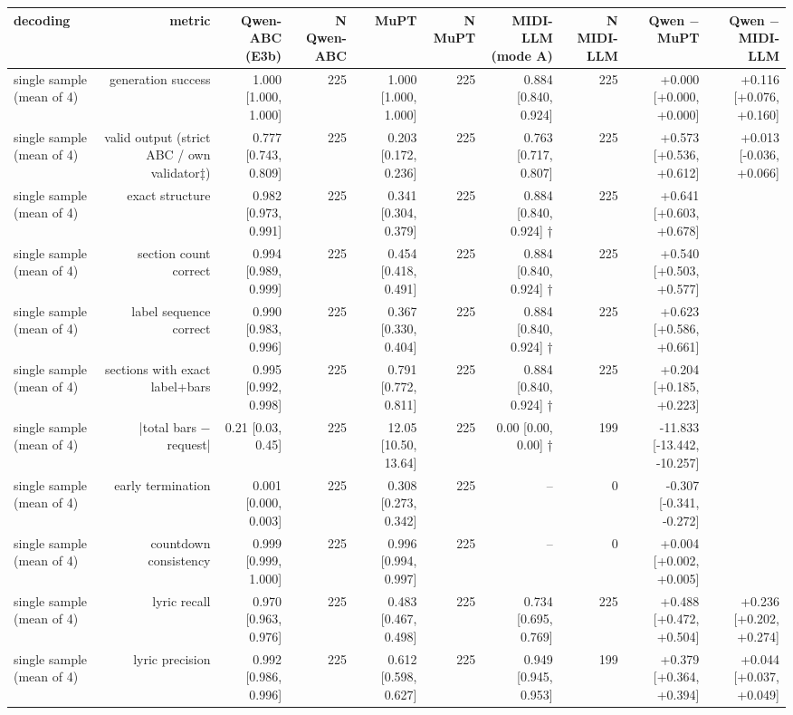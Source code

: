 \begin{table}[t]
\centering
\small
\begin{tabular}{lrrrrrrrrr}
\toprule
decoding & metric & Qwen-ABC (E3b) & N Qwen-ABC & MuPT & N MuPT & MIDI-LLM (mode A) & N MIDI-LLM & Qwen $-$ MuPT & Qwen $-$ MIDI-LLM \\
\midrule
single sample (mean of 4) & generation success & 1.000 [1.000, 1.000] & 225 & 1.000 [1.000, 1.000] & 225 & 0.884 [0.840, 0.924] & 225 & +0.000 [+0.000, +0.000] & +0.116 [+0.076, +0.160] \\
single sample (mean of 4) & valid output (strict ABC / own validator‡) & 0.777 [0.743, 0.809] & 225 & 0.203 [0.172, 0.236] & 225 & 0.763 [0.717, 0.807] & 225 & +0.573 [+0.536, +0.612] & +0.013 [-0.036, +0.066] \\
single sample (mean of 4) & exact structure & 0.982 [0.973, 0.991] & 225 & 0.341 [0.304, 0.379] & 225 & 0.884 [0.840, 0.924] † & 225 & +0.641 [+0.603, +0.678] &  \\
single sample (mean of 4) & section count correct & 0.994 [0.989, 0.999] & 225 & 0.454 [0.418, 0.491] & 225 & 0.884 [0.840, 0.924] † & 225 & +0.540 [+0.503, +0.577] &  \\
single sample (mean of 4) & label sequence correct & 0.990 [0.983, 0.996] & 225 & 0.367 [0.330, 0.404] & 225 & 0.884 [0.840, 0.924] † & 225 & +0.623 [+0.586, +0.661] &  \\
single sample (mean of 4) & sections with exact label+bars & 0.995 [0.992, 0.998] & 225 & 0.791 [0.772, 0.811] & 225 & 0.884 [0.840, 0.924] † & 225 & +0.204 [+0.185, +0.223] &  \\
single sample (mean of 4) & |total bars $-$ request| & 0.21 [0.03, 0.45] & 225 & 12.05 [10.50, 13.64] & 225 & 0.00 [0.00, 0.00] † & 199 & -11.833 [-13.442, -10.257] &  \\
single sample (mean of 4) & early termination & 0.001 [0.000, 0.003] & 225 & 0.308 [0.273, 0.342] & 225 & – & 0 & -0.307 [-0.341, -0.272] &  \\
single sample (mean of 4) & countdown consistency & 0.999 [0.999, 1.000] & 225 & 0.996 [0.994, 0.997] & 225 & – & 0 & +0.004 [+0.002, +0.005] &  \\
single sample (mean of 4) & lyric recall & 0.970 [0.963, 0.976] & 225 & 0.483 [0.467, 0.498] & 225 & 0.734 [0.695, 0.769] & 225 & +0.488 [+0.472, +0.504] & +0.236 [+0.202, +0.274] \\
single sample (mean of 4) & lyric precision & 0.992 [0.986, 0.996] & 225 & 0.612 [0.598, 0.627] & 225 & 0.949 [0.945, 0.953] & 199 & +0.379 [+0.364, +0.394] & +0.044 [+0.037, +0.049] \\

\end{tabular}
\end{table}
